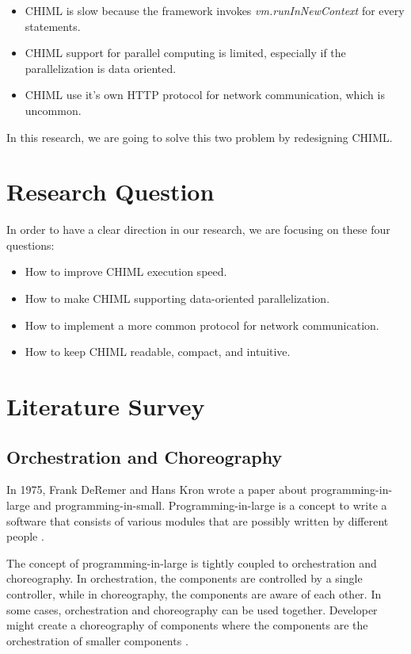 \documentclass[conference]{IEEEtran}
\begin{document}
\begin{itemize}
    \item CHIML is slow because the framework invokes {\it vm.runInNewContext } for every statements.
    \item CHIML support for parallel computing is limited, especially if the parallelization is data oriented.
    \item CHIML use it's own HTTP protocol for network communication, which is uncommon.
\end{itemize}

In this research, we are going to solve this two problem by redesigning CHIML.

\section{Research Question}

In order to have a clear direction in our research, we are focusing on these four questions:

\begin{itemize}
    \item How to improve CHIML execution speed.
    \item How to make CHIML supporting data-oriented parallelization.
    \item How to implement a more common protocol for network communication.
    \item How to keep CHIML readable, compact, and intuitive.
\end{itemize}


\section{Literature Survey}

\subsection{Orchestration and Choreography}

In 1975, Frank DeRemer and Hans Kron wrote a paper about programming-in-large and programming-in-small. Programming-in-large is a concept to write a software that consists of various modules that are possibly written by different people \cite{DeRemer:1975:PLV:390016.808431}.

The concept of programming-in-large is tightly coupled to orchestration and choreography. In orchestration, the components are controlled by a single controller, while in choreography, the components are aware of each other. In some cases, orchestration and choreography can be used together. Developer might create a choreography of components where the components are the orchestration of smaller components \cite{orchestrationvschoreography}. 
\end{document}
